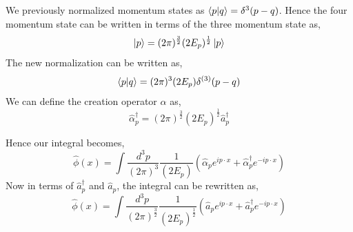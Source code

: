   We previously normalized momentum states as $\bra{p}\ket{q}= \delta ^{3}(p-q)$. Hence the four momentum state can be written in terms of the three momentum state as, 
  \begin{equation}
      \ket{p}= (2\pi)^{\frac{3}{2}}(2E_{p})^{\frac{1}{2}} \ket{p}
  \end{equation}
  The new normalization can be written as, 
  \begin{equation}
      \bra{p}\ket{q} = (2\pi)^{3}(2E_{p}) \delta^{(3)} (p-q)
  \end{equation}
  We can define the creation operator $\alpha$ as, 
  \begin{equation}
      \hat{\alpha}^{\dagger}_{p} = (2\pi)^{\frac{3}{2}}(2E_{p})^{\frac{1}{2}} \hat{a}^{\dagger}_{p}
  \end{equation}
  
  Hence our integral becomes, 
  \begin{equation}
       \hat{\phi}(x) = \int\frac{d^{3}p}{(2\pi)^{3}} \frac{1}{(2 E_{p})} (\hat{\alpha}_{p}e^{ip \cdot x} + \hat{\alpha}^{\dagger}_{p}e^{-ip \cdot x})
  \end{equation}
  Now in terms of $\hat{a}^{\dagger}_{p}$ and $ \hat{a}_{p}$, the integral can be rewritten as, 
  \begin{equation}
      \hat{\phi}(x) = \int\frac{d^{3}p}{(2\pi)^{\frac{3}{2}}} \frac{1}{(2 E_{p})^{\frac{1}{2}}} (\hat{a}_{p}e^{ip \cdot x} + \hat{a}^{\dagger}_{p}e^{-ip \cdot x})
  \end{equation}
